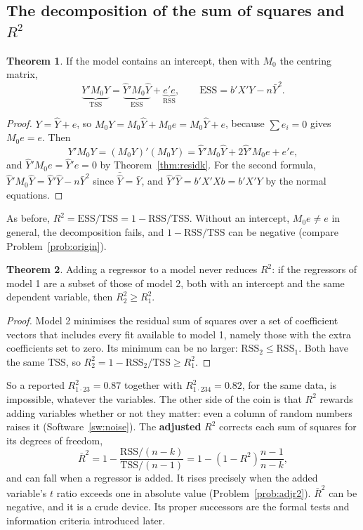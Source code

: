 \documentclass[11pt,a4paper]{article}
\numberwithin{equation}{section}
\theoremstyle{definition}
\newtheorem{thm}{Theorem}[subsection]
\begin{document}
\subsection{The decomposition of the sum of squares and $R^2$}
\label{ssec:r2k}

\begin{thm}
\label{thm:anovak}
If the model contains an intercept, then with $M_0$ the centring matrix,
\[
\underbrace{Y'M_0Y}_{\text{TSS}} = \underbrace{\hat Y'M_0\hat Y}_{\text{ESS}} + \underbrace{e'e}_{\text{RSS}}, \qquad
\text{ESS} = b'X'Y - n\bar Y^2 .
\]
\end{thm}

\begin{proof}
$Y = \hat Y + e$, so $M_0Y = M_0\hat Y + M_0e = M_0\hat Y + e$, because $\sum e_i = 0$ gives $M_0e = e$. Then
\[
Y'M_0Y = (M_0Y)'(M_0Y) = \hat Y'M_0\hat Y + 2\hat Y'M_0e + e'e ,
\]
and $\hat Y'M_0e = \hat Y'e = 0$ by Theorem~\ref{thm:residk}. For the second formula,
$\hat Y'M_0\hat Y = \hat Y'\hat Y - n\bar Y^2$ since $\bar{\hat Y} = \bar Y$, and $\hat Y'\hat Y = b'X'Xb = b'X'Y$ by the normal equations.
\end{proof}

As before, $R^2 = \text{ESS}/\text{TSS} = 1 - \text{RSS}/\text{TSS}$. Without an intercept, $M_0e \neq e$ in general, the decomposition fails, and
$1 - \text{RSS}/\text{TSS}$ can be negative (compare Problem~\ref{prob:origin}).

\begin{thm}
\label{thm:r2mono}
Adding a regressor to a model never reduces $R^2$: if the regressors of model 1 are a subset of those of model 2, both with an intercept and the
same dependent variable, then $R_2^2 \geq R_1^2$.
\end{thm}

\begin{proof}
Model 2 minimises the residual sum of squares over a set of coefficient vectors that includes every fit available to model 1, namely those with
the extra coefficients set to zero. Its minimum can be no larger: $\text{RSS}_2 \leq \text{RSS}_1$. Both have the same TSS, so
$R_2^2 = 1 - \text{RSS}_2/\text{TSS} \geq R_1^2$.
\end{proof}

So a reported $R^2_{1\cdot23} = 0.87$ together with $R^2_{1\cdot234} = 0.82$, for the same data, is impossible, whatever the variables. The other side of
the coin is that $R^2$ rewards adding variables whether or not they matter: even a column of random numbers raises it (Software~\ref{sw:noise}).
The \textbf{adjusted} $R^2$ corrects each sum of squares for its degrees of freedom,
\[
\bar R^2 = 1 - \frac{\text{RSS}/(n - k)}{\text{TSS}/(n - 1)} = 1 - (1 - R^2)\frac{n - 1}{n - k} ,
\]
and can fall when a regressor is added. It rises precisely when the added variable's $t$ ratio exceeds one in absolute value
(Problem~\ref{prob:adjr2}). $\bar R^2$ can be negative, and it is a crude device. Its proper successors are the formal tests and information
criteria introduced later.
\end{document}
